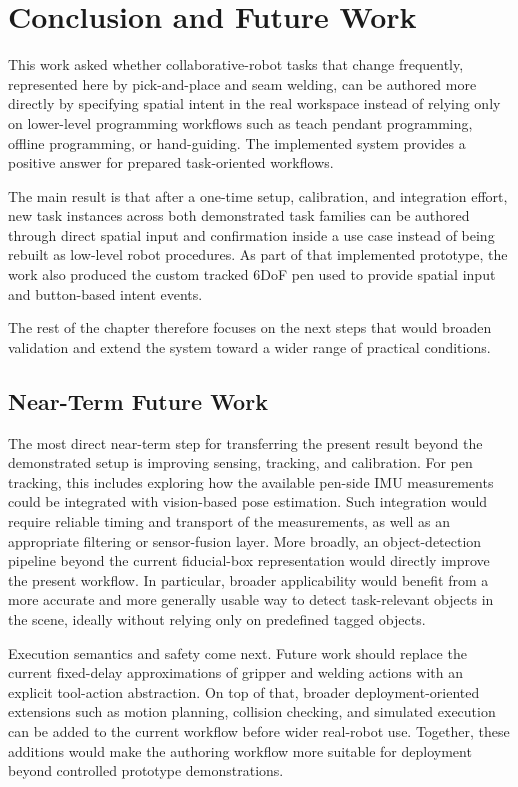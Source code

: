 \chapter{Conclusion and Future Work} \label{chapter:ch7_conclusion}

This work asked whether collaborative-robot tasks that change frequently, represented here by pick-and-place and seam welding, can be authored more directly by specifying spatial intent in the real workspace instead of relying only on lower-level programming workflows such as teach pendant programming, offline programming, or hand-guiding. The implemented system provides a positive answer for prepared task-oriented workflows.

The main result is that after a one-time setup, calibration, and integration effort, new task instances across both demonstrated task families can be authored through direct spatial input and confirmation inside a use case instead of being rebuilt as low-level robot procedures. As part of that implemented prototype, the work also produced the custom tracked 6DoF pen used to provide spatial input and button-based intent events.

The rest of the chapter therefore focuses on the next steps that would broaden validation and extend the system toward a wider range of practical conditions.

\section{Near-Term Future Work}

The most direct near-term step for transferring the present result beyond the demonstrated setup is improving sensing, tracking, and calibration. For pen tracking, this includes exploring how the available pen-side IMU measurements could be integrated with vision-based pose estimation. Such integration would require reliable timing and transport of the measurements, as well as an appropriate filtering or sensor-fusion layer. More broadly, an object-detection pipeline beyond the current fiducial-box representation would directly improve the present workflow. In particular, broader applicability would benefit from a more accurate and more generally usable way to detect task-relevant objects in the scene, ideally without relying only on predefined tagged objects.

Execution semantics and safety come next. Future work should replace the current fixed-delay approximations of gripper and welding actions with an explicit tool-action abstraction. On top of that, broader deployment-oriented extensions such as motion planning, collision checking, and simulated execution can be added to the current workflow before wider real-robot use. Together, these additions would make the authoring workflow more suitable for deployment beyond controlled prototype demonstrations.

